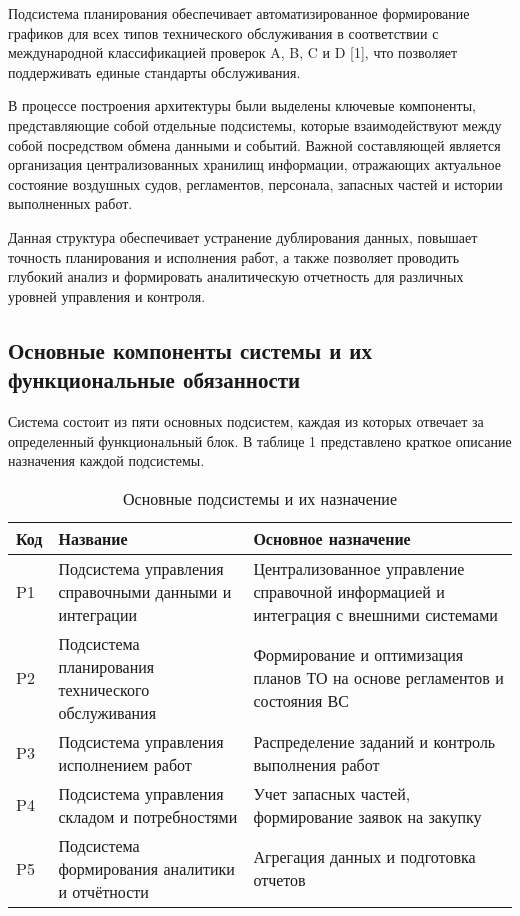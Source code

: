 \documentclass[14pt,a4paper]{extarticle}
\begin{document}
Подсистема планирования обеспечивает автоматизированное формирование графиков для всех типов технического обслуживания в соответствии с международной классификацией проверок A, B, C и D [1], что позволяет поддерживать единые стандарты обслуживания.

В процессе построения архитектуры были выделены ключевые компоненты, представляющие собой отдельные подсистемы, которые взаимодействуют между собой посредством обмена данными и событий. Важной составляющей является организация централизованных хранилищ информации, отражающих актуальное состояние воздушных судов, регламентов, персонала, запасных частей и истории выполненных работ.  

Данная структура обеспечивает устранение дублирования данных, повышает точность планирования и исполнения работ, а также позволяет проводить глубокий анализ и формировать аналитическую отчетность для различных уровней управления и контроля.

\subsection{Основные компоненты системы и их функциональные обязанности}

Система состоит из пяти основных подсистем, каждая из которых отвечает за определенный функциональный блок. В таблице 1 представлено краткое описание назначения каждой подсистемы.

\begin{table}[h]
\caption{Основные подсистемы и их назначение}
\begin{tabular}{|p{1.5cm}|p{4cm}|p{9cm}|}
\hline
Код & Название & Основное назначение \\
\hline
P1 & Подсистема управления справочными данными и интеграции & Централизованное управление справочной информацией и интеграция с внешними системами \\
\hline
P2 & Подсистема планирования технического обслуживания & Формирование и оптимизация планов ТО на основе регламентов и состояния ВС \\
\hline
P3 & Подсистема управления исполнением работ & Распределение заданий и контроль выполнения работ \\
\hline
P4 & Подсистема управления складом и потребностями & Учет запасных частей, формирование заявок на закупку \\
\hline
P5 & Подсистема формирования аналитики и отчётности & Агрегация данных и подготовка отчетов \\
\hline
\end{tabular}
\end{table}
\end{document}
